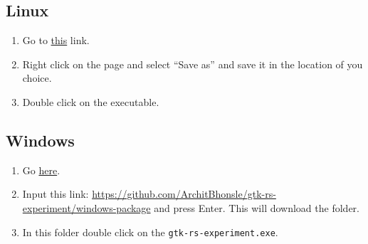 \documentclass[12pt, a4]{article}
\begin{document}
\subsection{Linux}

\begin{enumerate}
  \item{Go to \href{https://raw.githubusercontent.com/ArchitBhonsle/gtk-rs-experiment/main/data/linux-executable}{this}
        link.}
  \item{Right click on the page and select ``Save as'' and save it in the location of you choice.}
  \item{Double click on the executable.}
\end{enumerate}

\subsection{Windows}

\begin{enumerate}
  \item{Go \href{https://download-directory.github.io/}{here}.}
  \item{Input this link: \url{https://github.com/ArchitBhonsle/gtk-rs-experiment/windows-package} and press Enter. This will download the folder.}
  \item{In this folder double click on the \texttt{gtk-rs-experiment.exe}.}
\end{enumerate}
\end{document}
